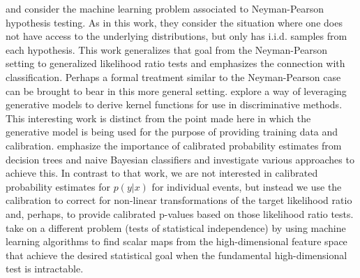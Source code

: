 \documentclass[aoas,preprint]{imsart}
\numberwithin{equation}{section}
\theoremstyle{plain}
\begin{document}
\cite{ClaytonScott} and \cite{JMLR:v14:tong13a} consider the machine learning problem associated to Neyman-Pearson hypothesis testing. As in this work, they consider the situation where one does not have access to the underlying distributions, but only has i.i.d. samples from each hypothesis. This work generalizes that goal from the Neyman-Pearson setting to generalized likelihood ratio tests and emphasizes the connection with classification. Perhaps a  formal treatment similar to the Neyman-Pearson case can be brought to bear in this more general setting.
\cite{TommiJaakkola} explore a way of leveraging generative models to derive kernel functions for use in discriminative methods. This interesting work is distinct from the point made here in which the generative model is being used for the purpose of providing training data and calibration.  
\cite{BiancaZadrozny} emphasize the importance of calibrated probability estimates from decision trees and naive Bayesian classifiers and investigate various approaches to achieve this. In contrast to that work, we are not interested in calibrated probability estimates for $p(y|x)$ for individual events, but instead we use the calibration to correct for non-linear transformations of the target likelihood ratio and, perhaps, to provide calibrated p-values based on those likelihood ratio tests. \cite{Ihler2004} take on a different problem (tests of statistical independence) by using machine learning algorithms to find  scalar maps from the high-dimensional feature space that achieve the desired statistical goal when the fundamental high-dimensional test is intractable.
\end{document}
